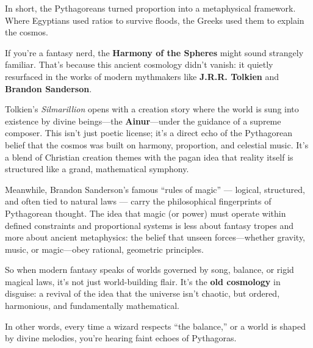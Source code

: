 \medskip

In short, the Pythagoreans turned proportion into a metaphysical framework. Where Egyptians used ratios to survive floods, the Greeks used them to explain the cosmos.

\medskip

\begin{tcolorbox}[colback=blue!5!white, colframe=blue!50!black, title={Historical Sidebar: Why Fantasy Worlds Feel Like the Harmony of the Spheres}]

    If you’re a fantasy nerd, the \textbf{Harmony of the Spheres} might sound strangely familiar. That’s because this ancient cosmology didn’t vanish: it quietly resurfaced in the works of modern mythmakers like \textbf{J.R.R. Tolkien} and \textbf{Brandon Sanderson}.

    \medskip
    
    Tolkien’s \textit{Silmarillion} opens with a creation story where the world is sung into existence by divine beings—the \textbf{Ainur}—under the guidance of a supreme composer. This isn’t just poetic license; it’s a direct echo of the Pythagorean belief that the cosmos was built on harmony, proportion, and celestial music. It’s a blend of Christian creation themes with the pagan idea that reality itself is structured like a grand, mathematical symphony.

    \medskip
    
    Meanwhile, Brandon Sanderson’s famous ``rules of magic'' --- logical, structured, and often tied to natural laws --- carry the philosophical fingerprints of Pythagorean thought. The idea that magic (or power) must operate within defined constraints and proportional systems is less about fantasy tropes and more about ancient metaphysics: the belief that unseen forces—whether gravity, music, or magic—obey rational, geometric principles.
    
    \medskip

    So when modern fantasy speaks of worlds governed by song, balance, or rigid magical laws, it’s not just world-building flair. It’s the \textbf{old cosmology} in disguise: a revival of the idea that the universe isn’t chaotic, but ordered, harmonious, and fundamentally mathematical.

    \medskip
    
    In other words, every time a wizard respects ``the balance,'' or a world is shaped by divine melodies, you’re hearing faint echoes of Pythagoras.
    
\end{tcolorbox}
